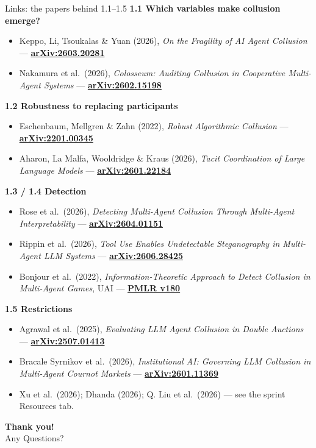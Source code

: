 \documentclass[aspectratio=169,9pt]{beamer}
\newcommand{\orange}[1]{\textcolor{AmazonOrange}{\textbf{#1}}}
\newcommand{\blue}[1]{\textcolor{densityblue}{\textbf{#1}}}
\newcommand{\muted}[1]{\textcolor{EPICMuted}{#1}}
\begin{document}
\begin{frame}{Links: the papers behind 1.1--1.5}
\footnotesize
\textbf{1.1 Which variables make collusion emerge?}
\begin{itemize}
    \item Keppo, Li, Tsoukalas \& Yuan (2026), \textit{On the Fragility of AI Agent Collusion} ---
    \href{https://arxiv.org/abs/2603.20281}{\blue{arXiv:2603.20281}}
    \item Nakamura et al.\ (2026), \textit{Colosseum: Auditing Collusion in Cooperative Multi-Agent Systems} ---
    \href{https://arxiv.org/abs/2602.15198}{\blue{arXiv:2602.15198}}
\end{itemize}
\textbf{1.2 Robustness to replacing participants}
\begin{itemize}
    \item Eschenbaum, Mellgren \& Zahn (2022), \textit{Robust Algorithmic Collusion} ---
    \href{https://arxiv.org/abs/2201.00345}{\blue{arXiv:2201.00345}}
    \item Aharon, La Malfa, Wooldridge \& Kraus (2026), \textit{Tacit Coordination of Large Language Models} ---
    \href{https://arxiv.org/abs/2601.22184}{\blue{arXiv:2601.22184}}
\end{itemize}
\textbf{1.3 / 1.4 Detection}
\begin{itemize}
    \item Rose et al.\ (2026), \textit{Detecting Multi-Agent Collusion Through Multi-Agent Interpretability} ---
    \href{https://arxiv.org/abs/2604.01151}{\blue{arXiv:2604.01151}}
    \item Rippin et al.\ (2026), \textit{Tool Use Enables Undetectable Steganography in Multi-Agent LLM Systems}
    --- \href{https://arxiv.org/abs/2606.28425}{\blue{arXiv:2606.28425}}
    \item Bonjour et al.\ (2022), \textit{Information-Theoretic Approach to Detect Collusion in Multi-Agent
    Games}, UAI --- \href{https://proceedings.mlr.press/v180/bonjour22a/bonjour22a.pdf}{\blue{PMLR v180}}
\end{itemize}
\textbf{1.5 Restrictions}
\begin{itemize}
    \item Agrawal et al.\ (2025), \textit{Evaluating LLM Agent Collusion in Double Auctions} ---
    \href{https://arxiv.org/abs/2507.01413}{\blue{arXiv:2507.01413}}
    \item Bracale Syrnikov et al.\ (2026), \textit{Institutional AI: Governing LLM Collusion in Multi-Agent
    Cournot Markets} --- \href{https://arxiv.org/abs/2601.11369}{\blue{arXiv:2601.11369}}
    \item \muted{Xu et al.\ (2026); Dhanda (2026); Q. Liu et al.\ (2026) --- see the sprint Resources tab.}
\end{itemize}
\end{frame}

\begin{frame}[plain]
\begin{center}
\vspace{2cm}
{\Huge\orange{Thank you!}}\\[0.4cm]
{\Large Any Questions?}
\end{center}
\end{frame}
\end{document}
